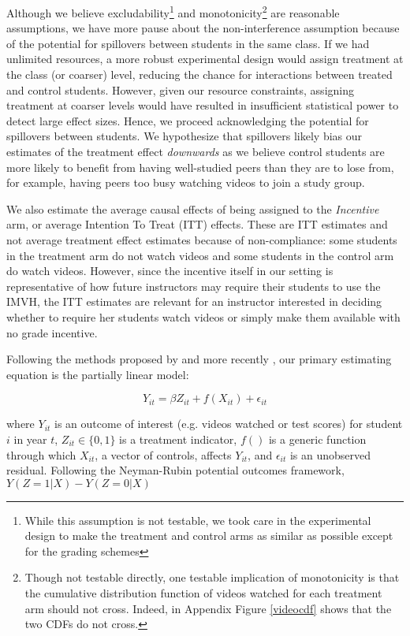 \documentclass[12pt]{article}
\begin{document}
Although we believe excludability\footnote{While this assumption is not testable, we took care in the experimental design to make the treatment and control arms as similar as possible except for the grading schemes} and monotonicity\footnote{Though not testable directly, one testable implication of monotonicity is that the cumulative distribution function of videos watched for each treatment arm should not cross. Indeed, in Appendix Figure \ref{videocdf} shows that the two CDFs do not cross.}  are reasonable assumptions, we have more pause about the non-interference assumption because of the potential for spillovers between students in the same class. If we had unlimited resources, a more robust experimental design would assign treatment at the class (or coarser) level, reducing the chance for interactions between treated and control students. However, given our resource constraints, assigning treatment at coarser levels would have resulted in insufficient statistical power to detect large effect sizes. Hence, we proceed acknowledging the potential for spillovers between students. We hypothesize that spillovers likely bias our estimates of the treatment effect \textit{downwards} as we believe control students are more likely to benefit from having well-studied peers than they are to lose from, for example, having peers too busy watching videos to join a study group.	

We also estimate the average causal effects of being assigned to the \textit{Incentive} arm, or average Intention To Treat (ITT) effects. These are ITT estimates and not average treatment effect estimates because of non-compliance: some students in the treatment arm do not watch videos and some students in the control arm do watch videos. However, since the incentive itself in our setting is representative of how future instructors may require their students to use the IMVH, the ITT estimates are relevant for an instructor interested in deciding whether to require her students watch videos or simply make them available with no grade incentive.

Following the methods proposed by \textcite{robinson1988} and more recently \textcite{wa2018}, our primary estimating equation is the partially linear model:

\begin{equation}
	Y_{it} = \beta Z_{it} + f(X_{it}) + \epsilon_{it}
\end{equation}

where $Y_{it}$ is an outcome of interest (e.g. videos watched or test scores) for student $i$ in year $t$, $Z_{it} \in \{0,1\}$ is a treatment indicator, $f()$ is a generic function through which $X_{it}$, a vector of controls, affects $Y_{it}$, and $\epsilon_{it}$ is an unobserved residual. Following the Neyman-Rubin potential outcomes framework, $Y(Z=1|X) - Y(Z=0|X)$
\end{document}
